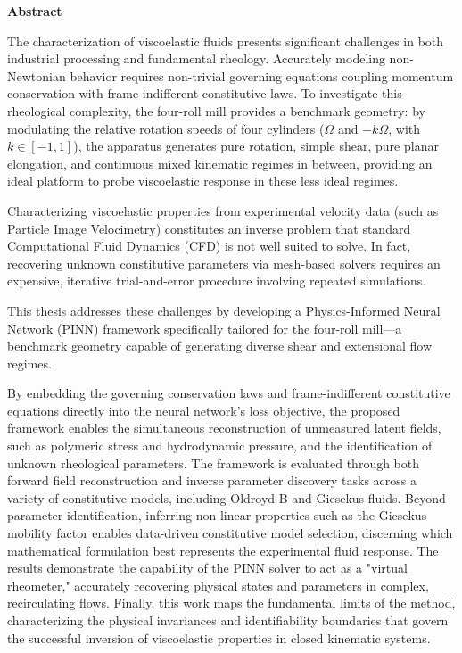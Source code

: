 \begin{center}
    \vspace*{1.2cm}
    {\Large \textbf{Abstract}}
    \vspace{0.8cm}
\end{center}

\noindent

The characterization of viscoelastic fluids presents significant challenges in both industrial processing and fundamental rheology.
Accurately modeling non-Newtonian behavior requires non-trivial governing
equations coupling momentum conservation with frame-indifferent constitutive
laws. To investigate this rheological complexity, the four-roll
mill provides a benchmark geometry: by modulating the relative rotation speeds
of four cylinders ($\Omega$ and $-k\Omega$, with $k \in [-1, 1]$), the apparatus
generates pure rotation, simple shear, pure planar elongation, and continuous
mixed kinematic regimes in between, providing an ideal platform to probe
viscoelastic response in these less ideal regimes.

Characterizing viscoelastic properties from experimental velocity data
(such as Particle Image Velocimetry) constitutes an inverse problem that standard
Computational Fluid Dynamics (CFD) is not well suited to solve. In fact, recovering unknown
constitutive parameters via mesh-based solvers requires an expensive, iterative
trial-and-error procedure involving repeated simulations.

This thesis addresses these challenges by developing a Physics-Informed Neural
Network (PINN) framework specifically tailored for the four-roll mill—a benchmark
geometry capable of generating diverse shear and extensional flow regimes.

By embedding the governing conservation laws and frame-indifferent constitutive
equations directly into the neural network's loss objective, the proposed
framework enables the simultaneous reconstruction of unmeasured latent fields,
such as polymeric stress and hydrodynamic pressure, and the identification of
unknown rheological parameters. The framework is evaluated through both forward
field reconstruction and inverse parameter discovery tasks across a variety of
constitutive models, including Oldroyd-B and Giesekus fluids. Beyond parameter
identification, inferring non-linear properties such as the Giesekus mobility
factor enables data-driven constitutive model selection, discerning which
mathematical formulation best represents the experimental fluid response. The
results demonstrate the capability of the PINN solver to act as a "virtual
rheometer," accurately recovering physical states and parameters in complex,
recirculating flows. Finally, this work maps the fundamental limits of the
method, characterizing the physical invariances and identifiability boundaries
that govern the successful inversion of viscoelastic properties in closed
kinematic systems.
\clearpage
